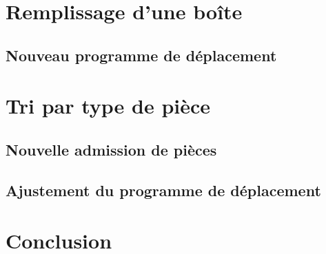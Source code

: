 \documentclass[oneside,a4paper,12pt]{article}
\begin{document}
	\section{Remplissage d'une boîte}
		\subsection{Nouveau programme de déplacement}

	\section{Tri par type de pièce}
		\subsection{Nouvelle admission de pièces}
		
		\subsection{Ajustement du programme de déplacement}
	
	\section{Conclusion}
	
\end{document}
